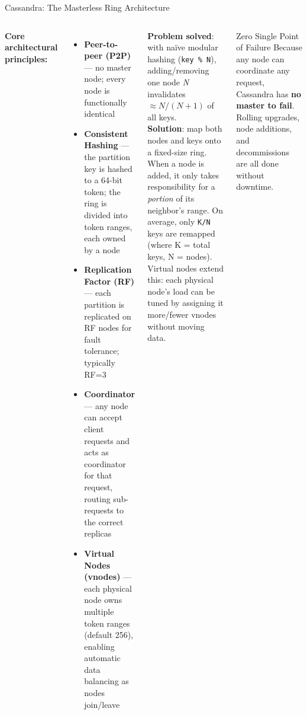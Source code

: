 \documentclass[aspectratio=169]{beamer}
\begin{document}
\begin{frame}{Cassandra: The Masterless Ring Architecture}
  \begin{columns}[T]
      \textbf{Core architectural principles:}
      \begin{itemize}\small
        \item \textbf{Peer-to-peer (P2P)} — no master node; every node is functionally identical
        \item \textbf{Consistent Hashing} — the partition key is hashed to a 64-bit token; the ring is divided into token ranges, each owned by a node
        \item \textbf{Replication Factor (RF)} — each partition is replicated on RF nodes for fault tolerance; typically RF=3
        \item \textbf{Coordinator} — any node can accept client requests and acts as coordinator for that request, routing sub-requests to the correct replicas
        \item \textbf{Virtual Nodes (vnodes)} — each physical node owns multiple token ranges (default 256), enabling automatic data balancing as nodes join/leave
      \end{itemize}
      \begin{tcolorbox}[deepdivebox, title={Deep Dive: Consistent Hashing}]
        \scriptsize
        \textbf{Problem solved}: with naïve modular hashing (\texttt{key \% N}), adding/removing one node \textit{N} invalidates $\approx N/(N+1)$ of all keys.
        \vspace{0.1cm}\\
        \textbf{Solution}: map both nodes and keys onto a fixed-size ring. When a node is added, it only takes responsibility for a \textit{portion} of its neighbor's range. On average, only \texttt{K/N} keys are remapped (where K = total keys, N = nodes).
        \vspace{0.1cm}\\
        Virtual nodes extend this: each physical node's load can be tuned by assigning it more/fewer vnodes without moving data.
      \end{tcolorbox}
      \vspace{0.2cm}
      \begin{alertblock}{Zero Single Point of Failure}
        \scriptsize Because any node can coordinate any request, Cassandra has \textbf{no master to fail}. Rolling upgrades, node additions, and decommissions are all done without downtime.
      \end{alertblock}
  \end{columns}
\end{frame}
\end{document}
